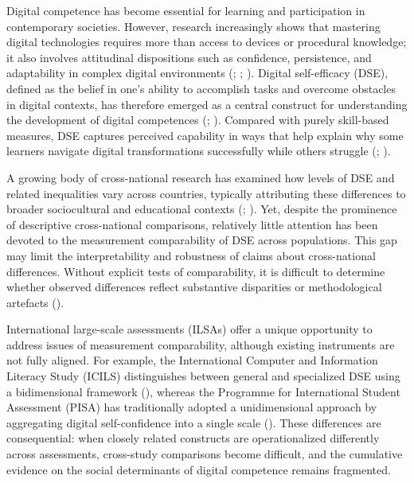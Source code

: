 \documentclass[
  letterpaper,
  DIV=11,
  numbers=noendperiod]{scrartcl}
\begin{document}
Digital competence has become essential for learning and participation
in contemporary societies. However, research increasingly shows that
mastering digital technologies requires more than access to devices or
procedural knowledge; it also involves attitudinal dispositions such as
confidence, persistence, and adaptability in complex digital
environments (;
;
).
Digital self-efficacy (DSE), defined as the belief in one's ability to
accomplish tasks and overcome obstacles in digital contexts, has
therefore emerged as a central construct for understanding the
development of digital competences
(;
). Compared with purely skill-based measures, DSE captures
perceived capability in ways that help explain why some learners
navigate digital transformations successfully while others struggle
(;
).

A growing body of cross-national research has examined how levels of DSE
and related inequalities vary across countries, typically attributing
these differences to broader sociocultural and educational contexts
(;
). Yet,
despite the prominence of descriptive cross-national comparisons,
relatively little attention has been devoted to the measurement
comparability of DSE across populations. This gap may limit the
interpretability and robustness of claims about cross-national
differences. Without explicit tests of comparability, it is difficult to
determine whether observed differences reflect substantive disparities
or methodological artefacts
().

International large-scale assessments (ILSAs) offer a unique opportunity
to address issues of measurement comparability, although existing
instruments are not fully aligned. For example, the International
Computer and Information Literacy Study (ICILS) distinguishes between
general and specialized DSE using a bidimensional framework
(), whereas
the Programme for International Student Assessment (PISA) has
traditionally adopted a unidimensional approach by aggregating digital
self-confidence into a single scale (). These differences are consequential: when closely related
constructs are operationalized differently across assessments,
cross-study comparisons become difficult, and the cumulative evidence on
the social determinants of digital competence remains fragmented.
\end{document}
